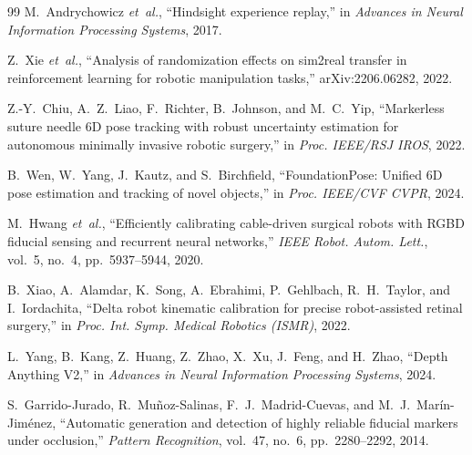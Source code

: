\documentclass[letterpaper, 10 pt, conference]{ieeeconf}  %
\begin{document}
\begin{thebibliography}{99}
M.~Andrychowicz \emph{et~al.}, ``Hindsight experience replay,'' in
\emph{Advances in Neural Information Processing Systems}, 2017.

Z.~Xie \emph{et~al.}, ``Analysis of randomization effects on sim2real transfer in
reinforcement learning for robotic manipulation tasks,'' arXiv:2206.06282, 2022.

Z.-Y.~Chiu, A.~Z.~Liao, F.~Richter, B.~Johnson, and M.~C.~Yip, ``Markerless
suture needle 6D pose tracking with robust uncertainty estimation for autonomous
minimally invasive robotic surgery,'' in \emph{Proc. IEEE/RSJ IROS}, 2022.

B.~Wen, W.~Yang, J.~Kautz, and S.~Birchfield, ``FoundationPose: Unified 6D pose
estimation and tracking of novel objects,'' in \emph{Proc. IEEE/CVF CVPR}, 2024.

M.~Hwang \emph{et~al.}, ``Efficiently calibrating cable-driven surgical robots
with RGBD fiducial sensing and recurrent neural networks,'' \emph{IEEE Robot.
Autom. Lett.}, vol.~5, no.~4, pp.~5937--5944, 2020.

B.~Xiao, A.~Alamdar, K.~Song, A.~Ebrahimi, P.~Gehlbach, R.~H.~Taylor, and
I.~Iordachita, ``Delta robot kinematic calibration for precise robot-assisted
retinal surgery,'' in \emph{Proc. Int. Symp. Medical Robotics (ISMR)}, 2022.

L.~Yang, B.~Kang, Z.~Huang, Z.~Zhao, X.~Xu, J.~Feng, and H.~Zhao, ``Depth
Anything V2,'' in \emph{Advances in Neural Information Processing Systems}, 2024.

S.~Garrido-Jurado, R.~Mu\~noz-Salinas, F.~J.~Madrid-Cuevas, and
M.~J.~Mar\'in-Jim\'enez, ``Automatic generation and detection of highly reliable
fiducial markers under occlusion,'' \emph{Pattern Recognition}, vol.~47, no.~6,
pp.~2280--2292, 2014.

\end{thebibliography}
\end{document}
